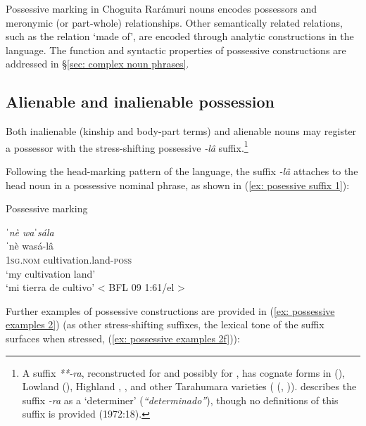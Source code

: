 Possessive marking in Choguita Rarámuri nouns encodes possessors and meronymic (or part-whole) relationships. Other semantically related relations, such as the relation ‘made of’, are encoded through analytic constructions in the language. The function and syntactic properties of possessive constructions are addressed in §\ref{sec: complex noun phrases}.

\subsection{Alienable and inalienable possession}
\label{subsec: possessive}

Both inalienable (kinship and body-part terms) and alienable nouns may register a possessor with the stress-shifting possessive \textit{-lâ} suffix.\footnote{A suffix \textit{**-ra}, reconstructed for  and possibly for  \citep[][299]{dakin1991nahuatl}, has cognate forms in  (\citealt{Lionnet-1978}), Lowland  (\citealt{barreras1988posesion}), Highland  \parencite{miller1996guarijio},  \parencite{dakin1991nahuatl}, and other Tarahumara varieties ( (\citealt{brambila1953gramatica}, \citealt{lionnet1972elementos})). \citet{lionnet1972elementos} describes the suffix \textit{-ra} as a ‘determiner’ (\textit{“determinado”}), though no definitions of this suffix is provided (1972:18).}

Following the head-marking pattern of the language, the suffix \textit{-lâ} attaches to the head noun in a possessive nominal phrase, as shown in (\ref{ex: posessive suffix 1}):

\ea\label{ex: posessive suffix 1}
{Possessive marking}

    {\textit{ˈnè    waˈsála}}\\
    \gll    ˈnè   wasá-lâ\\
            \textsc{1sg.nom}  cultivation.land-\textsc{poss} \\
    \glt    ‘my cultivation land'\\
    \glt    ‘mi tierra de cultivo’  < BFL 09 1:61/el > \\

\z

Further examples of possessive constructions are provided in (\ref{ex: possessive examples 2}) (as other stress-shifting suffixes, the lexical tone of the suffix surfaces when stressed, (\ref{ex: possessive examples 2f})):

